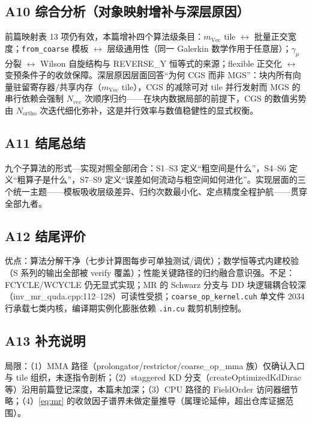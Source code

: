 \documentclass[UTF8]{ctexart}
\begin{document}
\subsection{A10 综合分析（对象映射增补与深层原因）}

前篇映射表 13 项仍有效，本篇增补四个算法级条目：$m_{\text{Vec}}$ tile $\leftrightarrow$ 批量正交宽度；\texttt{from\_coarse} 模板 $\leftrightarrow$ 层级通用性（同一 Galerkin 数学作用于任意层）；$\gamma_\mu$ 分裂 $\leftrightarrow$ Wilson 自旋结构与 REVERSE\_Y 恒等式的来源；flexible 正交化 $\leftrightarrow$ 变预条件子的收敛保障。深层原因层面回答``为何 CGS 而非 MGS''：块内所有向量驻留寄存器/共享内存（$m_{\text{Vec}}$ tile），CGS 的减除可对 tile 并行发射而 MGS 的串行依赖会强制 $N_{vec}$ 次顺序归约——在块内数据局部的前提下，CGS 的数值劣势由 $N_{\text{ortho}}$ 次迭代细化弥补，这是并行效率与数值稳健性的显式权衡。

\subsection{A11 结尾总结}

\begin{conclbox}
九个子算法的形式—实现对照全部闭合：S1--S3 定义``粗空间是什么''，S4--S6 定义``粗算子是什么''，S7--S9 定义``误差如何流动与粗空间如何进化''。实现层面的三个统一主题——模板吸收层级差异、归约次数最小化、定点精度全程护航——贯穿全部九者。
\end{conclbox}

\subsection{A12 结尾评价}

优点：算法分解干净（七步计算图每步可单独测试/调优）；数学恒等式内建校验（S 系列的输出全部被 verify 覆盖）；性能关键路径的归约融合意识强。不足：FCYCLE/WCYCLE 仍无显式实现；MR 的 Schwarz 分支与 DD 块逻辑耦合较深（inv\_mr\_quda.cpp:112--128）可读性受损；\texttt{coarse\_op\_kernel.cuh} 单文件 2034 行承载七类内核，编译期实例化膨胀依赖 \texttt{.in.cu} 裁剪机制控制。

\subsection{A13 补充说明}

局限：（1）MMA 路径（prolongator/restrictor/coarse\_op\_mma 族）仅确认入口与 tile 组织，未逐指令剖析；（2）staggered KD 分支（createOptimizedKdDirac 等）沿用前篇登记深度，本篇未加深；（3）CPU 路径的 FieldOrder 访问器细节略；（4）\eqref{eq:mr} 的收敛因子谱界未做定量推导（属理论延伸，超出仓库证据范围）。
\end{document}
